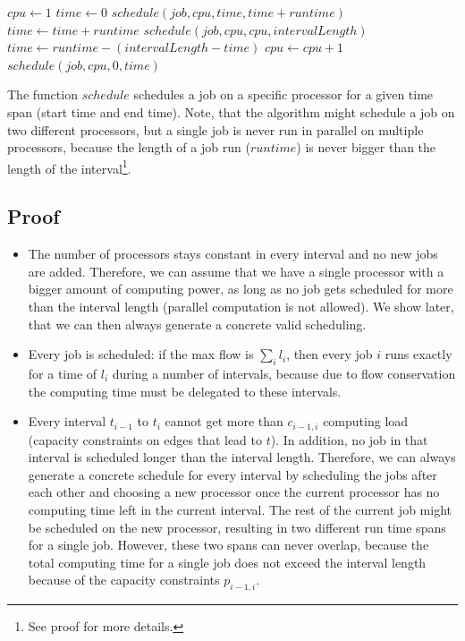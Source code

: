 \documentclass[12pt]{article}
\begin{document}
\begin{algorithmic}
	\State $\mathit{cpu} \gets 1$
	\State $\mathit{time} \gets 0$
			\State $\mathit{schedule}(\mathit{job}, \mathit{cpu}, \mathit{time}, \mathit{time} + \mathit{runtime})$
			\State $\mathit{time} \gets \mathit{time} + \mathit{runtime}$
		\Else
			\State $\mathit{schedule}(\mathit{job}, \mathit{cpu}, \mathit{cpu}, \mathit{intervalLength})$
			\State $\mathit{time} \gets \mathit{runtime} - (\mathit{intervalLength} - \mathit{time})$
			\State $\mathit{cpu} \gets \mathit{cpu} + 1$
			\State $\mathit{schedule}(\mathit{job}, \mathit{cpu}, 0, \mathit{time})$
		\EndIf
	\EndFor
\end{algorithmic}

The function $\mathit{schedule}$ schedules a job on a specific processor for a given time span (start time and end time). Note, that the algorithm might schedule a job on two different processors, but a single job is never run in parallel on multiple processors, because the length of a job run ($\mathit{runtime}$) is never bigger than the length of the interval\footnote{See proof for more details.}.

\subsection*{Proof}
\begin{itemize}
	\item The number of processors stays constant in every interval and no new jobs are added. Therefore, we can assume that we have a single processor with a bigger amount of computing power, as long as no job gets scheduled for more than the interval length (parallel computation is not allowed). We show later, that we can then always generate a concrete valid scheduling.
	\item Every job is scheduled: if the max flow is $\sum_i l_i$, then every job $i$ runs exactly for a time of $l_i$ during a number of intervals, because due to flow conservation the computing time must be delegated to these intervals.
	\item Every interval $t_{i-1}$ to $t_{i}$ cannot get more than $c_{i-1, i}$ computing load (capacity constraints on edges that lead to $t$). In addition, no job in that interval is scheduled longer than the interval length. Therefore, we can always generate a concrete schedule for every interval by scheduling the jobs after each other and choosing a new processor once the current processor has no computing time left in the current interval. The rest of the current job might be scheduled on the new processor, resulting in two different run time spans for a single job. However, these two spans can never overlap, because the total computing time for a single job does not exceed the interval length because of the capacity constraints $p_{i-1, i}$.
\end{itemize}
\end{document}
